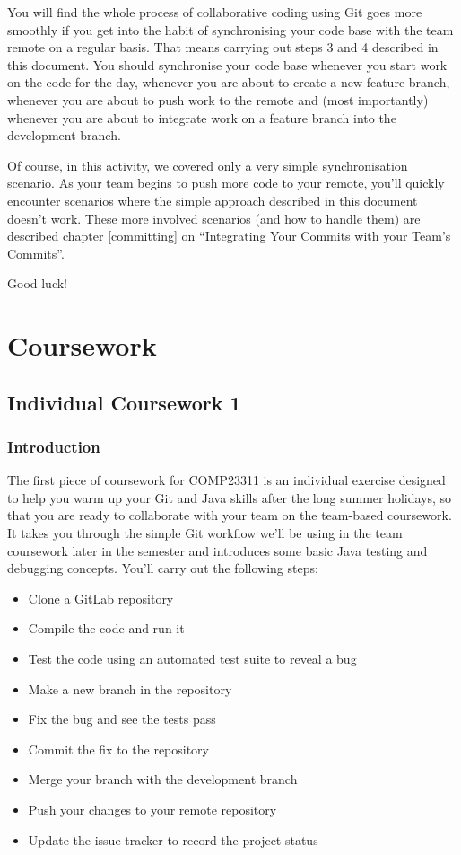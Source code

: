 \documentclass[
]{book}
\providecommand{\tightlist}{%
  \setlength{\itemsep}{0pt}\setlength{\parskip}{0pt}}
\begin{document}
You will find the whole process of collaborative coding using Git goes more smoothly if you get into the habit of synchronising your code base with the team remote on a regular basis. That means carrying out steps 3 and 4 described in this document. You should synchronise your code base whenever you start work on the code for the day, whenever you are about to create a new feature branch, whenever you are about to push work to the remote and (most importantly) whenever you are about to integrate work on a feature branch into the development branch.

Of course, in this activity, we covered only a very simple synchronisation scenario. As your team begins to push more code to your remote, you'll quickly encounter scenarios where the simple approach described in this document doesn't work. These more involved scenarios (and how to handle them) are described chapter \ref{committing} on ``Integrating Your Commits with your Team's Commits''.

Good luck!

\hypertarget{part-coursework}{%
\part{Coursework}\label{part-coursework}}

\hypertarget{gitting}{%
\chapter{Individual Coursework 1}\label{gitting}}

\hypertarget{introcw1}{%
\section{Introduction}\label{introcw1}}

The first piece of coursework for COMP23311 is an individual exercise designed to help you warm up your Git and Java skills after the long summer holidays, so that you are ready to collaborate with your team on the team-based coursework. It takes you through the simple Git workflow we'll be using in the team coursework later in the semester and introduces some basic Java testing and debugging concepts. You'll carry out the following steps:

\begin{itemize}
\tightlist
\item
  Clone a GitLab repository
\item
  Compile the code and run it
\item
  Test the code using an automated test suite to reveal a bug
\item
  Make a new branch in the repository
\item
  Fix the bug and see the tests pass
\item
  Commit the fix to the repository
\item
  Merge your branch with the development branch
\item
  Push your changes to your remote repository
\item
  Update the issue tracker to record the project status
\end{itemize}
\end{document}
